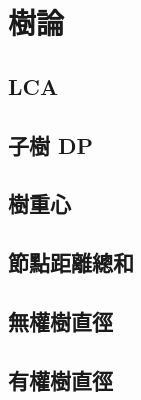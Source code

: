 \section{樹論}
\subsection{LCA} 

\subsection{子樹 DP} 

\subsection{樹重心} 

\subsection{節點距離總和}

\subsection{無權樹直徑} 

\subsection{有權樹直徑} 
